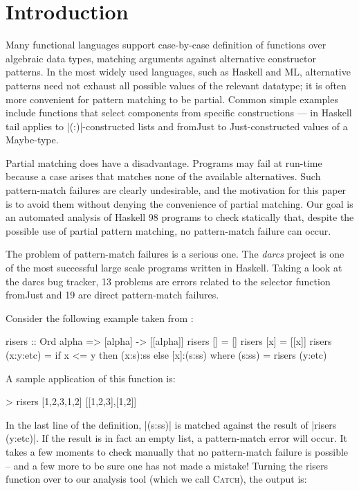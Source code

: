 \documentclass[preprint]{sigplanconf}
\newcommand{\C}[1]{\textsf{#1}}
\newcommand{\catch}{\textsc{Catch}}
\newcommand{\ignore}{}
\begin{document}
\section{Introduction}
\label{sec:introduction}

Many functional languages support case-by-case definition of functions
over algebraic data types, matching arguments against alternative
constructor patterns.  In the most widely used languages, such as Haskell
and ML, alternative patterns need not exhaust all possible values of
the relevant datatype; it is often more convenient for pattern matching
to be partial.  Common simple examples include functions that select
components from specific constructions --- in Haskell \C{tail} applies
to |(:)|-constructed lists and \C{fromJust} to \C{Just}-constructed values of
a \C{Maybe}-type.

Partial matching does have a disadvantage.  Programs may fail at run-time
because a case arises that matches none of the available alternatives.
Such pattern-match failures are clearly undesirable, and the motivation
for this paper is to avoid them without denying the convenience of
partial matching.  Our goal is an automated analysis of Haskell 98 programs
to check statically that, despite the possible use of partial pattern
matching, no pattern-match failure can occur.

The problem of pattern-match failures is a serious one. The \textit{darcs} project \citep{darcs} is one of the most successful large scale programs written in Haskell. Taking a look at the darcs bug tracker, 13 problems are errors related to the selector function \C{fromJust} and 19 are direct pattern-match failures.

Consider the following example taken from \citet{me:catch_tfp}:

\begin{code}
risers :: Ord alpha => [alpha] -> [[alpha]]
risers [] = []
risers [x] = [[x]]
risers (x:y:etc) = if x <= y then (x:s):ss else [x]:(s:ss)
    where (s:ss) = risers (y:etc)
\end{code}

A sample application of this function is:

\ignore\begin{code}
> risers [1,2,3,1,2]
[[1,2,3],[1,2]]
\end{code}

In the last line of the definition, |(s:ss)| is matched against the result of |risers (y:etc)|. If the result is in fact an empty list, a pattern-match error will occur. It takes a few moments to check manually that no pattern-match failure is possible -- and a few more to be sure one has not made a mistake! Turning the \C{risers} function over to our analysis tool (which we call \catch{}), the output is:
\end{document}
